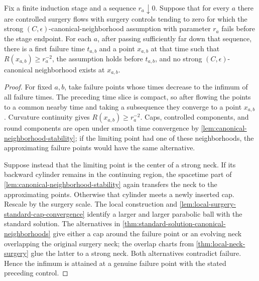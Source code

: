 \begin{lemma}
\label{lem:canonical-neighborhood-first-failure}
\notready
Fix a finite induction stage and a sequence $r_a\downarrow0$.  Suppose that
for every $a$ there are controlled surgery flows with surgery controls
tending to zero for which the strong $(C,\epsilon)$-canonical-neighborhood
assumption with parameter $r_a$ fails before the stage endpoint.  For each
$a$, after passing sufficiently far down that sequence, there is a first
failure time $t_{a,b}$ and a point $x_{a,b}$ at that time such that
$R(x_{a,b})\ge r_a^{-2}$, the assumption holds before $t_{a,b}$, and no
strong $(C,\epsilon)$-canonical neighborhood exists at $x_{a,b}$.
\end{lemma}

\begin{proof}
For fixed $a,b$, take failure points whose times decrease to the infimum of
all failure times.  The preceding time slice is compact, so after flowing
the points to a common nearby time and taking a subsequence they converge to
a point $x_{a,b}$.  Curvature continuity gives
$R(x_{a,b})\ge r_a^{-2}$.  Caps, controlled components, and round components
are open under smooth time convergence by
\ref{lem:canonical-neighborhood-stability}; if the limiting point had one of
these neighborhoods, the approximating failure points would have the same
alternative.

Suppose instead that the limiting point is the center of a strong neck.
If its backward cylinder remains in the continuing region, the spacetime
part of \ref{lem:canonical-neighborhood-stability} again transfers the neck
to the approximating points.  Otherwise that cylinder meets a newly inserted
cap.  Rescale by the surgery scale.  The local construction and
\ref{lem:local-surgery-standard-cap-convergence} identify a larger and
larger parabolic ball with the standard solution.  The alternatives in
\ref{thm:standard-solution-canonical-neighborhoods} give either a cap around
the failure point or an evolving neck overlapping the original surgery
neck; the overlap charts from \ref{thm:local-neck-surgery} glue the latter to
a strong neck.  Both alternatives contradict failure.  Hence the infimum is
attained at a genuine failure point with the stated preceding control.
\end{proof}

